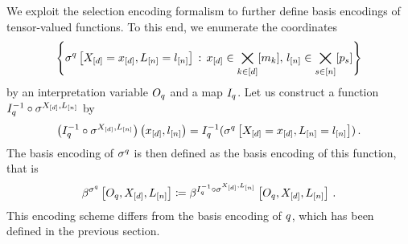 We exploit the selection encoding formalism to further define basis encodings of tensor-valued functions.
To this end, we enumerate the coordinates
\begin{align*}
	\left\{ \sigma^{q}\left[X_{[d]}=x_{[d]},L_{[n]}=l_{[n]}\right] \,:\, x_{[d]}\in\bigtimes_{k\in[d]}[m_{k}],\, l_{[n]}\in\bigtimes_{s\in[n]}[p_{s}] \right\}
\end{align*}
by an interpretation variable $O_{q}$ and a map $I_{q}$.
Let us construct a function $I_{q}^{-1}\circ\sigma^{X_{[d]},L_{[n]}}$ by
\begin{align*}
	\left(I_{q}^{-1}\circ\sigma^{X_{[d]},L_{[n]}}\right)\left(x_{[d]},l_{[n]}\right)
	= I_{q}^{-1}(\sigma^{q}\left[X_{[d]}=x_{[d]},L_{[n]}=l_{[n]}\right]) \, .
\end{align*}
The basis encoding of $\sigma^{q}$ is then defined as the basis encoding of this function, that is
\begin{align*}
	\beta^{\sigma^{q}}\left[O_{q},X_{[d]},L_{[n]}\right]
	\coloneqq \beta^{I_{q}^{-1}\circ\sigma^{X_{[d]},L_{[n]}}}\left[O_{q},X_{[d]},L_{[n]}\right] \, .
\end{align*}
This encoding scheme differs from the basis encoding of $q$, which has been defined in the previous section.